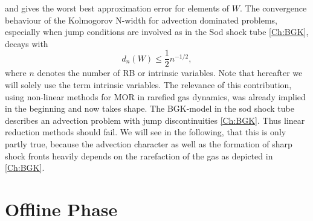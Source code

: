and gives the worst best approximation error for elements of \(W\). The convergence behaviour of the Kolmogorov N-width for advection dominated problems, especially when jump conditions are involved as in the Sod shock tube \cref{Ch:BGK}, decays with
\begin{equation}
	d_n(W) \leq \frac{1}{2} n^{-1/2},
\end{equation}
where \(n\) denotes the number of RB or intrinsic variables. Note that hereafter we will solely use the term intrinsic variables. The relevance of this contribution, using non-linear methods for MOR in rarefied gas dynamics, was already implied in the beginning and now takes shape. The BGK-model in the sod shock tube describes an advection problem with jump discontinuities \cref{Ch:BGK}. Thus linear reduction methods should fail. We will see in the following, that this is only partly true, because the advection character as well as the formation of sharp shock fronts heavily depends on the rarefaction of the gas as depicted in \cref{Ch:BGK}.   
\section{Offline Phase}
